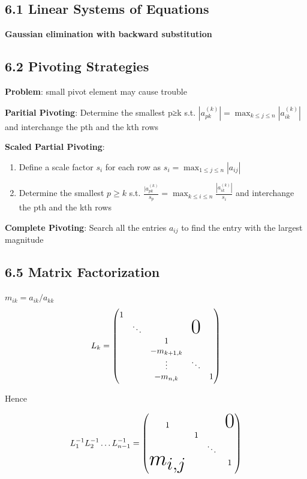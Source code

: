 \documentclass[11pt]{article}
\begin{document}
\subsection{6.1 Linear Systems of Equations}
\label{sec:orgb65acc2}
\textbf{Gaussian elimination with backward substitution}
\subsection{6.2 Pivoting Strategies}
\label{sec:org3c842b3}
\textbf{Problem}: small pivot element may cause trouble

\textbf{Paritial Pivoting}: Determine the smallest p≥k s.t.
\(|a_{pk}^{(k)}|=\displaystyle\max_{k\le j\le n}|a_{ik}^{(k)}|\) and
interchange the pth and the kth rows

\textbf{Scaled Partial Pivoting}:
\begin{enumerate}
\item Define a scale factor \(s_i\) for each row as \(s_i=\displaystyle\max_{1\le
      j\le n}|a_{ij}|\)
\item Determine the smallest \(p\ge k\) s.t.
\(\frac{|a_{pk}^{(k)}}{s_p}=\displaystyle\max_{k\le i\le
      n}\frac{|a_{ik}^{(k)}|}{s_i}\)
and interchange the pth and the kth rows
\end{enumerate}


\textbf{Complete Pivoting}: Search all the entries \(a_{ij}\) to find the entry with
the largest magnitude
\subsection{6.5 Matrix Factorization}
\label{sec:org35b5f09}
\(m_{ik}=a_{ik}/a_{kk}\)
\begin{equation*}
L_k=
\begin{pmatrix}
1 &            &            &               &  \\
  & \ddots     &            &\mbox{\Huge 0} &  \\
  &            & 1          &               &  \\
  &            & -m_{k+1,k} &               &  \\
  &            & \vdots     & \ddots        &  \\
  &            & -m_{n,k}   &               & 1\\
\end{pmatrix}
\end{equation*}  


Hence 

\begin{equation*}
L_1^{-1}L_2^{-1}\dots L_{n-1}^{-1}=
\begin{pmatrix}
1&&&\mbox{\Huge 0}\\
&1&&\\
&&\ddots&\\
\text{\Huge $m_{i,j}$}&&&1\\
\end{pmatrix}
\end{equation*}
\end{document}
